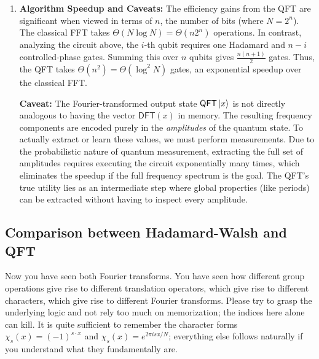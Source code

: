 \begin{enumerate}
    \item \textbf{Algorithm Speedup and Caveats:}
    The efficiency gains from the QFT are significant when viewed in terms of $n$, the number of bits (where $N = 2^n$). The classical FFT takes $\Theta(N \log N) = \Theta(n2^n)$ operations. In contrast, analyzing the circuit above, the $i$-th qubit requires one Hadamard and $n-i$ controlled-phase gates. Summing this over $n$ qubits gives $\frac{n(n+1)}{2}$ gates. Thus, the QFT takes $\Theta(n^2) = \Theta(\log^2 N)$ gates, an exponential speedup over the classical FFT.
    
    \textbf{Caveat:} The Fourier-transformed output state $\mathsf{QFT}\ket{x}$ is not directly analogous to having the vector $\mathsf{DFT}(x)$ in memory. The resulting frequency components are encoded purely in the \textit{amplitudes} of the quantum state. To actually extract or learn these values, we must perform measurements. Due to the probabilistic nature of quantum measurement, extracting the full set of amplitudes requires executing the circuit exponentially many times, which eliminates the speedup if the full frequency spectrum is the goal. The QFT's true utility lies as an intermediate step where global properties (like periods) can be extracted without having to inspect every amplitude.
\end{enumerate}

\subsection{Comparison between Hadamard-Walsh and QFT}

Now you have seen both Fourier transforms. You have seen how different group operations give rise to different translation operators, which give rise to different characters, which give rise to different Fourier transforms. Please try to grasp the underlying logic and not rely too much on memorization; the indices here alone can kill. It is quite sufficient to remember the character forms $\chi_s(x)=(-1)^{s \cdot x}$ and $\chi_s(x)=e^{2\pi isx/N}$; everything else follows naturally if you understand what they fundamentally are.

